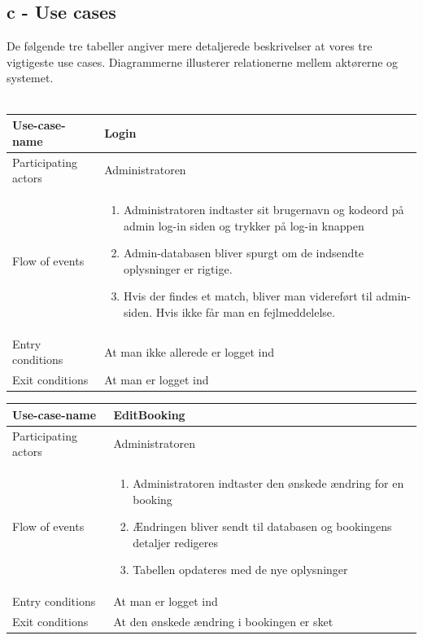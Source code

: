 \documentclass[12pt,a4paper]{article}
\begin{document}
\subsection{c - Use cases}
De følgende tre tabeller angiver mere detaljerede beskrivelser at vores tre vigtigeste use cases. Diagrammerne illusterer relationerne mellem aktørerne og systemet. \\\\
\begin{minipage}{\textwidth}

 \label{tab:title}
\begin{tabular}{| p{5cm} p{10cm} |}
\hline Use-case-name & Login \\
\hline Participating actors & Administratoren \\
\hline Flow of events & \begin{enumerate}
\item Administratoren indtaster sit brugernavn og kodeord på admin log-in siden og trykker på log-in knappen
\item Admin-databasen bliver spurgt om de indsendte oplysninger er rigtige.
\item Hvis der findes et match, bliver man videreført til admin-siden. Hvis ikke får man en fejlmeddelelse.
\end{enumerate} \\
\hline Entry conditions & At man ikke allerede er logget ind \\
\hline Exit conditions & At man er logget ind \\
\hline
\end{tabular}

\end{minipage}

\bigskip

\begin{minipage}{\textwidth}

 \label{tab:title}
\begin{tabular}{| p{5cm} p{10cm} |}
\hline Use-case-name & EditBooking \\
\hline Participating actors & Administratoren \\
\hline Flow of events & \begin{enumerate}
\item Administratoren indtaster den ønskede ændring for en booking
\item Ændringen bliver sendt til databasen og bookingens detaljer redigeres
\item Tabellen opdateres med de nye oplysninger
\end{enumerate} \\
\hline Entry conditions & At man er logget ind \\
\hline Exit conditions & At den ønskede ændring i bookingen er sket \\
\hline
\end{tabular}

\end{minipage}
	
\end{document}

